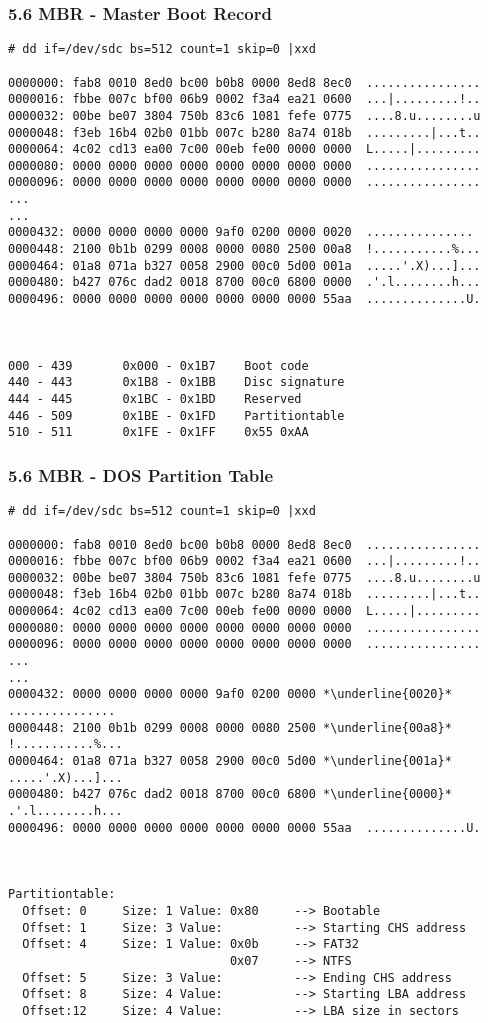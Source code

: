 \begin{frame}[fragile]
  \frametitle{5.6 MBR - Master Boot Record}
  \begin{lstlisting}[basicstyle=\tiny]
# dd if=/dev/sdc bs=512 count=1 skip=0 |xxd

0000000: fab8 0010 8ed0 bc00 b0b8 0000 8ed8 8ec0  ................
0000016: fbbe 007c bf00 06b9 0002 f3a4 ea21 0600  ...|.........!..
0000032: 00be be07 3804 750b 83c6 1081 fefe 0775  ....8.u........u
0000048: f3eb 16b4 02b0 01bb 007c b280 8a74 018b  .........|...t..
0000064: 4c02 cd13 ea00 7c00 00eb fe00 0000 0000  L.....|.........
0000080: 0000 0000 0000 0000 0000 0000 0000 0000  ................
0000096: 0000 0000 0000 0000 0000 0000 0000 0000  ................
...
...
0000432: 0000 0000 0000 0000 9af0 0200 0000 0020  ............... 
0000448: 2100 0b1b 0299 0008 0000 0080 2500 00a8  !...........%...
0000464: 01a8 071a b327 0058 2900 00c0 5d00 001a  .....'.X)...]...
0000480: b427 076c dad2 0018 8700 00c0 6800 0000  .'.l........h...
0000496: 0000 0000 0000 0000 0000 0000 0000 55aa  ..............U.



000 - 439       0x000 - 0x1B7    Boot code
440 - 443       0x1B8 - 0x1BB    Disc signature
444 - 445       0x1BC - 0x1BD    Reserved
446 - 509       0x1BE - 0x1FD    Partitiontable
510 - 511       0x1FE - 0x1FF    0x55 0xAA
  \end{lstlisting}
\end{frame}


\begin{frame}[fragile]
  \frametitle{5.6 MBR - DOS Partition Table}
  \begin{lstlisting}[basicstyle=\tiny,escapechar=\*]
# dd if=/dev/sdc bs=512 count=1 skip=0 |xxd

0000000: fab8 0010 8ed0 bc00 b0b8 0000 8ed8 8ec0  ................
0000016: fbbe 007c bf00 06b9 0002 f3a4 ea21 0600  ...|.........!..
0000032: 00be be07 3804 750b 83c6 1081 fefe 0775  ....8.u........u
0000048: f3eb 16b4 02b0 01bb 007c b280 8a74 018b  .........|...t..
0000064: 4c02 cd13 ea00 7c00 00eb fe00 0000 0000  L.....|.........
0000080: 0000 0000 0000 0000 0000 0000 0000 0000  ................
0000096: 0000 0000 0000 0000 0000 0000 0000 0000  ................
...
...
0000432: 0000 0000 0000 0000 9af0 0200 0000 *\underline{0020}*  ............... 
0000448: 2100 0b1b 0299 0008 0000 0080 2500 *\underline{00a8}*  !...........%...
0000464: 01a8 071a b327 0058 2900 00c0 5d00 *\underline{001a}*  .....'.X)...]...
0000480: b427 076c dad2 0018 8700 00c0 6800 *\underline{0000}*  .'.l........h...
0000496: 0000 0000 0000 0000 0000 0000 0000 55aa  ..............U.



Partitiontable:
  Offset: 0     Size: 1	Value: 0x80     --> Bootable
  Offset: 1     Size: 3	Value:          --> Starting CHS address
  Offset: 4     Size: 1	Value: 0x0b     --> FAT32
                               0x07     --> NTFS
  Offset: 5     Size: 3	Value:          --> Ending CHS address
  Offset: 8     Size: 4 Value:          --> Starting LBA address
  Offset:12     Size: 4 Value:          --> LBA size in sectors

  \end{lstlisting}
\end{frame}


